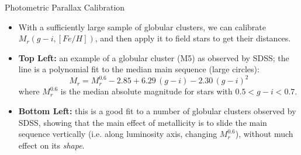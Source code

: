 \documentclass[letterpaper,landscape]{slides}
\begin{document}
\begin{slide}
{\begin{minipage}[t]{8cm}
\begin{center}
\end{center}
\end{minipage}

\begin{minipage}[t]{16cm}
\begin{center}
\vskip -1in
{\large \color{red} Photometric Parallax Calibration}
\end{center}


\begin{itemize}
\item {\color{blue} With a sufficiently large sample of globular clusters, we can calibrate 
      $M_r(g-i,[Fe/H])$, and then apply it to field stars to get their distances.}
\item {\bf Top Left:} an example of a globular cluster (M5) as observed by
       SDSS; the line is a polynomial fit to the median main sequence (large 
       circles):
\begin{equation}
       M_r = M_r^{0.6} -2.85 + 6.29 \, (g-i) -2.30 \, (g-i)^2  \nonumber
\end{equation}
where $M_r^{0.6}$ is the median absolute magnitude for stars 
with $0.5<g-i<0.7$. 
\item {\bf Bottom Left:} this is a good fit to a number of globular 
  clusters observed by SDSS, showing that the main effect of metallicity
  is to slide the main sequence vertically (i.e. along luminosity axis,
  changing $M_r^{0.6}$), without much effect on its {\it shape}.
\end{itemize}

\end{minipage}}
\vfill 
\end{slide}
\end{document}
